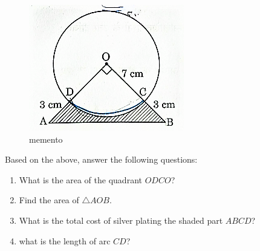 \documentclass{article}
\begin{document}
\begin{enumerate}
\begin{figure}[h]
    \centering
    \includegraphics[width= 5 cm]{30_2_1_Q36}
    \caption{memento}
    \label{fig:30_2_1_Q36}
\end{figure}

Based on the above, answer the following questions:
\begin{enumerate}[label=(\roman*)]
    \item What is the area of the quadrant $ODCO$?
    \item Find the area of $\triangle  AOB$.
    \item What is the total cost of silver plating the shaded part $ABCD$?
    \item what is the length of arc $CD$?
\end{enumerate}


\end{enumerate}
\end{document}
